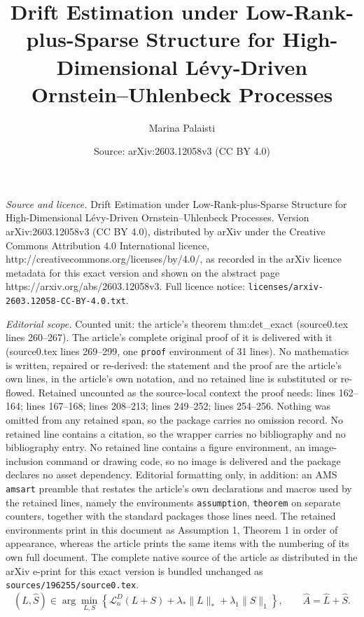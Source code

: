 \documentclass[10pt,a4paper]{amsart}
\title{Drift Estimation under Low-Rank-plus-Sparse Structure for High-Dimensional L\'evy-Driven Ornstein--Uhlenbeck Processes}
\author{Marina Palaisti}
\date{Source: arXiv:2603.12058v3 (CC BY 4.0)}
\begin{document}
\maketitle

\noindent\emph{Source and licence.} Drift Estimation under Low-Rank-plus-Sparse Structure for High-Dimensional L\'evy-Driven Ornstein--Uhlenbeck Processes. Version arXiv:2603.12058v3 (CC BY 4.0), distributed by arXiv under the Creative Commons Attribution 4.0 International licence, http://creativecommons.org/licenses/by/4.0/, as recorded in the arXiv licence metadata for this exact version and shown on the abstract page https://arxiv.org/abs/2603.12058v3. Full licence notice: \texttt{licenses/arxiv-2603.12058-CC-BY-4.0.txt}.\par\smallskip

\noindent\textit{Editorial scope.} Counted unit: the article's theorem thm:det\_exact (source0.tex lines 260--267). The article's complete original proof of it is delivered with it (source0.tex lines 269--299, one \texttt{proof} environment of 31 lines). No mathematics is written, repaired or re-derived: the statement and the proof are the article's own lines, in the article's own notation, and no retained line is substituted or re-flowed.  Retained uncounted as the source-local context the proof needs: lines 162--164; lines 167--168; lines 208--213; lines 249--252; lines 254--256.  Nothing was omitted from any retained span, so the package carries no omission record.  No retained line contains a citation, so the wrapper carries no bibliography and no bibliography entry.  No retained line contains a figure environment, an image-inclusion command or drawing code, so no image is delivered and the package declares no asset dependency.  Editorial formatting only, in addition: an AMS \texttt{amsart} preamble that restates the article's own declarations and macros used by the retained lines, namely the environments \texttt{assumption}, \texttt{theorem} on separate counters, together with the standard packages those lines need.  The retained environments print in this document as Assumption 1, Theorem 1 in order of appearance, whereas the article prints the same items with the numbering of its own full document.  The complete native source of the article as distributed in the arXiv e-print for this exact version is bundled unchanged as \texttt{sources/196255/source0.tex}.
	\begin{equation}
		(\widehat L,\widehat S) \in\arg\min_{L,S} \left\{\mathcal L_n^D(L+S)+\lambda_*\|L\|_*+\lambda_1\|S\|_1\right\}, \qquad \widehat A=\widehat L+\widehat S. \label{eq:estimator}
	\end{equation}
\end{document}
